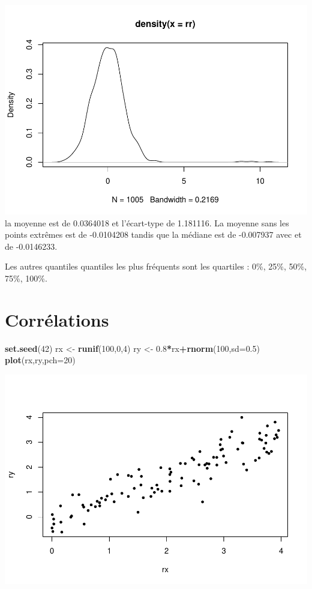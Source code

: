 \documentclass[
]{book}
\newenvironment{Shaded}{\begin{snugshade}}{\end{snugshade}}
\newcommand{\AttributeTok}[1]{\textcolor[rgb]{0.13,0.29,0.53}{#1}}
\newcommand{\DecValTok}[1]{\textcolor[rgb]{0.00,0.00,0.81}{#1}}
\newcommand{\FloatTok}[1]{\textcolor[rgb]{0.00,0.00,0.81}{#1}}
\newcommand{\FunctionTok}[1]{\textcolor[rgb]{0.13,0.29,0.53}{\textbf{#1}}}
\newcommand{\NormalTok}[1]{#1}
\newcommand{\OtherTok}[1]{\textcolor[rgb]{0.56,0.35,0.01}{#1}}
\newcommand{\SpecialCharTok}[1]{\textcolor[rgb]{0.81,0.36,0.00}{\textbf{#1}}}
\begin{document}
\includegraphics{_main_files/figure-latex/unnamed-chunk-15-1.pdf}
la moyenne est de 0.0364018 et l'écart-type de 1.181116. La moyenne sans
les points extrêmes est de -0.0104208 tandis que la médiane est de
-0.007937 avec et de -0.0146233.

Les autres quantiles quantiles les plus fréquents sont les quartiles :
0\%, 25\%, 50\%, 75\%, 100\%.

\hypertarget{corruxe9lations}{%
\section{Corrélations}\label{corruxe9lations}}

\begin{Shaded}
\begin{Highlighting}[]
\FunctionTok{set.seed}\NormalTok{(}\DecValTok{42}\NormalTok{)}
\NormalTok{rx }\OtherTok{\textless{}{-}} \FunctionTok{runif}\NormalTok{(}\DecValTok{100}\NormalTok{,}\DecValTok{0}\NormalTok{,}\DecValTok{4}\NormalTok{)}
\NormalTok{ry }\OtherTok{\textless{}{-}} \FloatTok{0.8}\SpecialCharTok{*}\NormalTok{rx}\SpecialCharTok{+}\FunctionTok{rnorm}\NormalTok{(}\DecValTok{100}\NormalTok{,}\AttributeTok{sd=}\FloatTok{0.5}\NormalTok{)}
\FunctionTok{plot}\NormalTok{(rx,ry,}\AttributeTok{pch=}\DecValTok{20}\NormalTok{)}
\end{Highlighting}
\end{Shaded}

\includegraphics{_main_files/figure-latex/unnamed-chunk-16-1.pdf}
\end{document}
